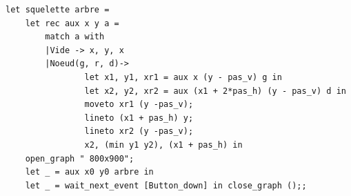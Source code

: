 \begin{Answer}
\begin{lstlisting}
let squelette arbre =
    let rec aux x y a =
        match a with
        |Vide -> x, y, x
        |Noeud(g, r, d)-> 
                let x1, y1, xr1 = aux x (y - pas_v) g in
                let x2, y2, xr2 = aux (x1 + 2*pas_h) (y - pas_v) d in
                moveto xr1 (y -pas_v);
                lineto (x1 + pas_h) y;
                lineto xr2 (y -pas_v);
                x2, (min y1 y2), (x1 + pas_h) in
    open_graph " 800x900";
    let _ = aux x0 y0 arbre in
    let _ = wait_next_event [Button_down] in close_graph ();;
\end{lstlisting}
\end{Answer}

\medskip

